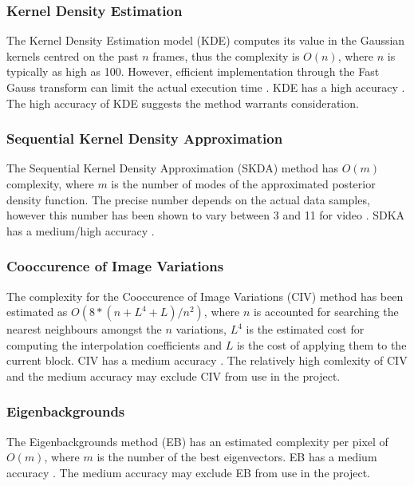 \subsubsection{Kernel Density Estimation}
The Kernel Density Estimation model (KDE) \cite{Elgammal2000} computes its value in the Gaussian kernels centred on the past $n$ frames, thus the complexity is $O(n)$, where $n$ is typically as high as 100. However, efficient implementation through the Fast Gauss transform can limit the actual execution time \cite{Elgammal2003}. KDE has a high accuracy \cite{Piccardi2004}. The high accuracy of KDE suggests the method warrants consideration.\\

\subsubsection{Sequential Kernel Density Approximation}
The Sequential Kernel Density Approximation (SKDA) \cite{Han2004} method has $O(m)$ complexity, where $m$ is the number of modes of the approximated posterior density function. The precise number depends on the actual data samples, however this number has been shown to vary between 3 and 11 for video \cite{Han2007}. SDKA has a medium/high accuracy \cite{Piccardi2004}.\\

\subsubsection{Cooccurence of Image Variations}
The complexity for the Cooccurence of Image Variations (CIV) \cite{Seki2003} method has been estimated as $O(8*(n+L^4+L)/n^2)$, where $n$ is accounted for searching the nearest neighbours amongst the $n$ variations, $L^4$ is the estimated cost for computing the interpolation coefficients and $L$ is the cost of applying them to the current block. CIV has a medium accuracy \cite{Piccardi2004}. The relatively high comlexity of CIV and the medium accuracy may exclude CIV from use in the project.\\

\subsubsection{Eigenbackgrounds}
The Eigenbackgrounds method (EB) \cite{Oliver2000} has an estimated complexity per pixel of $O(m)$, where $m$ is the number of the best eigenvectors. EB has a medium accuracy \cite{Piccardi2004}. The medium accuracy may exclude EB from use in the project.\\

